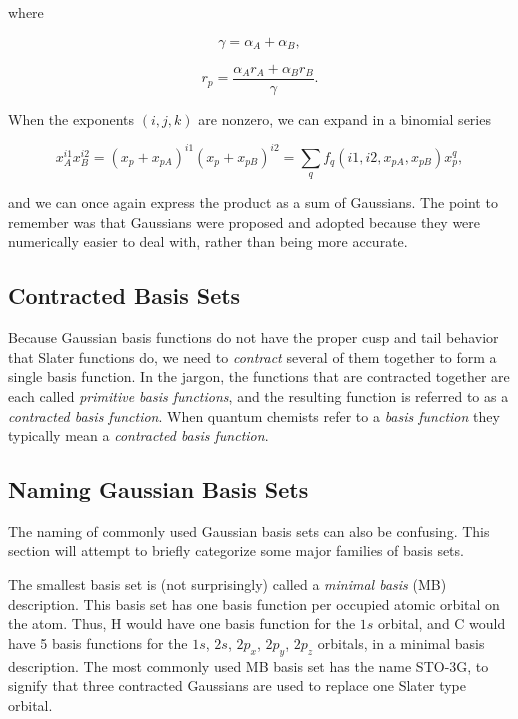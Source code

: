 \noindent where

\begin{equation}
	\gamma = \alpha_A+\alpha_B,
\end{equation}

\begin{equation}
	r_p = \frac{\alpha_Ar_A+\alpha_Br_B}{\gamma}.
\end{equation}

\noindent When the exponents $(i,j,k)$ are nonzero, we can expand in a
binomial series

\begin{equation}
	x_A^{i1}x_B^{i2} = (x_p+x_{pA})^{i1}(x_p+x_{pB})^{i2}
		= \sum_qf_q(i1,i2,x_{pA},x_{pB})x_p^q,
\end{equation}

\noindent and we can once again express the product as a sum of
Gaussians. The point to remember was that Gaussians were proposed and
adopted because they were numerically easier to deal with, rather than
being more accurate.

\subsection{Contracted Basis Sets}

Because Gaussian basis functions do not have the proper cusp and tail
behavior that Slater functions do, we need to \emph{contract} several
of them together to form a single basis function. In the jargon, the
functions that are contracted together are each called \emph{primitive
basis functions}, and the resulting function is referred to as a
\emph{contracted basis function}. When quantum chemists refer to a
\emph{basis function} they typically mean a \emph{contracted basis
function}. 


\subsection{Naming Gaussian Basis Sets}
The naming of commonly used Gaussian basis sets can also be
confusing. This section will attempt to briefly categorize some major
families of basis sets.

The smallest basis set is (not surprisingly) called a \emph{minimal
basis} (MB) description. This basis set has one basis function per
occupied atomic orbital on the atom. Thus, H would have one basis
function for the $1s$ orbital, and C would have 5 basis functions for
the $1s$, $2s$, $2p_x$, $2p_y$, $2p_z$ orbitals, in a minimal basis 
description. The most commonly used MB basis set has the name STO-3G,
to signify that three contracted Gaussians are used to replace one
Slater type orbital.

